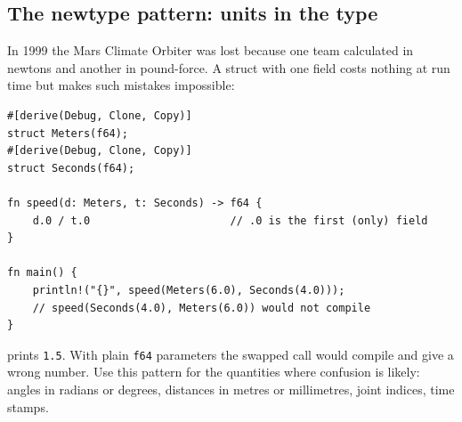 \subsection*{The newtype pattern: units in the type}
In 1999 the Mars Climate Orbiter was lost because one team calculated in newtons and another in pound-force. A struct with one field costs nothing at run time but makes such mistakes impossible:
\begin{verbatim}
#[derive(Debug, Clone, Copy)]
struct Meters(f64);
#[derive(Debug, Clone, Copy)]
struct Seconds(f64);

fn speed(d: Meters, t: Seconds) -> f64 {
    d.0 / t.0                      // .0 is the first (only) field
}

fn main() {
    println!("{}", speed(Meters(6.0), Seconds(4.0)));
    // speed(Seconds(4.0), Meters(6.0)) would not compile
}
\end{verbatim}
prints \verb!1.5!. With plain \verb!f64! parameters the swapped call would compile and give a wrong number. Use this pattern for the quantities where confusion is likely: angles in radians or degrees, distances in metres or millimetres, joint indices, time stamps.

